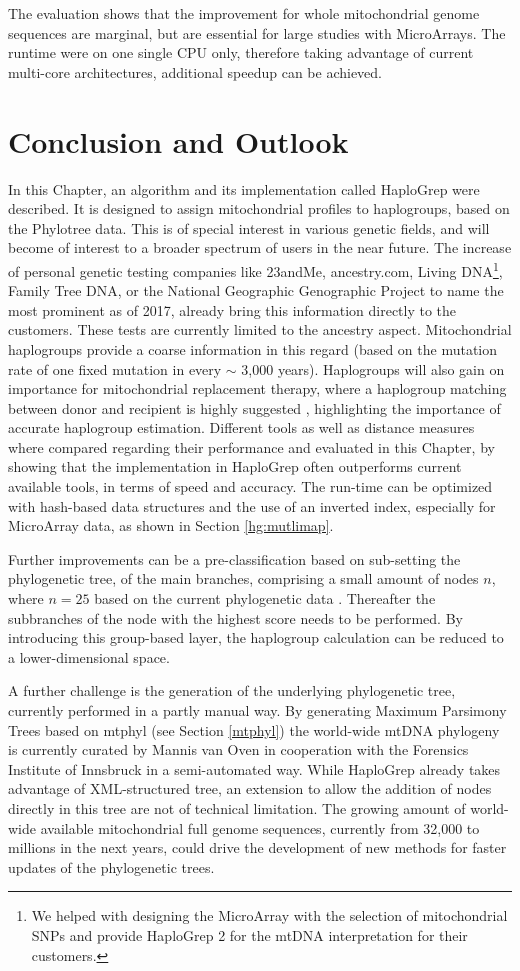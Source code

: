 The evaluation shows that the improvement for whole mitochondrial genome sequences are marginal, but are essential for large studies with MicroArrays. The runtime were on one single CPU only, therefore taking advantage of current multi-core architectures, additional speedup can be achieved. 

\section{Conclusion and Outlook}\label{hg:outlook}
In this Chapter, an algorithm and its implementation called HaploGrep were described. It is designed to assign mitochondrial profiles to haplogroups, based on the Phylotree data. This is of special interest in various genetic fields, and will become of interest to a broader spectrum of users in the near future. The increase of personal genetic testing companies like 23andMe, ancestry.com, Living DNA\footnote{We helped with designing the MicroArray with the selection of mitochondrial SNPs and provide HaploGrep 2 for the mtDNA interpretation for their customers.}, Family Tree DNA, or the National Geographic Genographic Project to name the most prominent as of 2017, already bring this information directly to the customers. These tests are currently limited to the ancestry aspect. Mitochondrial haplogroups provide a coarse information in this regard (based on the mutation rate of one fixed mutation in every $\sim$ 3,000 years). Haplogroups will also gain on importance for mitochondrial replacement therapy, where a haplogroup matching between donor and recipient is highly suggested \cite{Royrvik2016}, highlighting the importance of accurate haplogroup estimation. Different tools as well as distance measures where compared regarding their performance and evaluated in this Chapter, by showing that the implementation in HaploGrep often outperforms current available tools, in terms of speed and accuracy. The run-time can be optimized with hash-based data structures and the use of an inverted index, especially for MicroArray data, as shown in Section \ref{hg:mutlimap}. 

Further improvements can be a pre-classification based on sub-setting the phylogenetic tree, of the main branches, comprising a small amount of nodes $n$, where $n = 25$ based on the current phylogenetic data \cite{VanOven2015}. Thereafter the subbranches of the node with the highest score needs to be performed. By introducing this group-based layer, the haplogroup calculation can be reduced to a lower-dimensional space. 

A further challenge is the generation of the underlying phylogenetic tree, currently performed in a partly manual way. By generating Maximum Parsimony Trees based on mtphyl (see Section \ref{mtphyl}) the world-wide mtDNA phylogeny is currently curated by Mannis van Oven \cite{VanOven2015} in cooperation with the Forensics Institute of Innsbruck in a semi-automated way. While HaploGrep already takes advantage of XML-structured tree, an extension to allow the addition of nodes directly in this tree are not of technical limitation. The growing amount of world-wide available mitochondrial full genome sequences, currently from 32,000 to millions in the next years, could drive the development of new methods for faster updates of the phylogenetic trees. 
